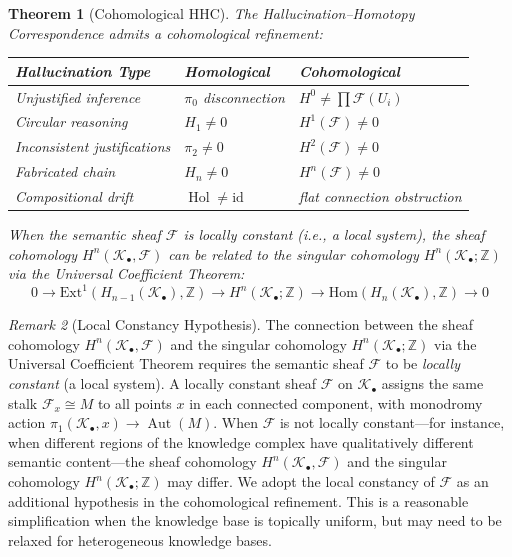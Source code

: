 \documentclass[11pt,a4paper]{article}
\theoremstyle{plain}
\newtheorem{theorem}{Theorem}[section]
\theoremstyle{definition}
\theoremstyle{remark}
\newtheorem{remark}[theorem]{Remark}
\newcommand{\id}{\mathrm{id}}
\newcommand{\Hom}{\mathrm{Hom}}
\DeclareMathOperator{\Aut}{Aut}
\DeclareMathOperator{\Hol}{Hol}
\begin{document}
\begin{theorem}[Cohomological HHC]\label{thm:cohomological-hhc}
The Hallucination--Homotopy Correspondence admits a cohomological refinement:
\begin{center}
\begin{tabular}{lll}
\toprule
\textbf{Hallucination Type} & \textbf{Homological} & \textbf{Cohomological} \\
\midrule
Unjustified inference & $\pi_0$ disconnection & $H^0 \neq \prod \mathcal{F}(U_i)$ \\
Circular reasoning & $H_1 \neq 0$ & $H^1(\mathcal{F}) \neq 0$ \\
Inconsistent justifications & $\pi_2 \neq 0$ & $H^2(\mathcal{F}) \neq 0$ \\
Fabricated chain & $H_n \neq 0$ & $H^n(\mathcal{F}) \neq 0$ \\
Compositional drift & $\Hol \neq \id$ & flat connection obstruction \\
\bottomrule
\end{tabular}
\end{center}
When the semantic sheaf $\mathcal{F}$ is locally constant (i.e., a local system), the sheaf cohomology $H^n(\mathcal{K}_\bullet, \mathcal{F})$ can be related to the singular cohomology $H^n(\mathcal{K}_\bullet; \mathbb{Z})$ via the Universal Coefficient Theorem:
\[
0 \to \mathrm{Ext}^1(H_{n-1}(\mathcal{K}_\bullet), \mathbb{Z}) \to H^n(\mathcal{K}_\bullet; \mathbb{Z}) \to \Hom(H_n(\mathcal{K}_\bullet), \mathbb{Z}) \to 0
\]
\end{theorem}

\begin{remark}[Local Constancy Hypothesis]\label{rem:local-constancy}
The connection between the sheaf cohomology $H^n(\mathcal{K}_\bullet, \mathcal{F})$ and the singular cohomology $H^n(\mathcal{K}_\bullet; \mathbb{Z})$ via the Universal Coefficient Theorem requires the semantic sheaf $\mathcal{F}$ to be \emph{locally constant} (a local system). A locally constant sheaf $\mathcal{F}$ on $\mathcal{K}_\bullet$ assigns the same stalk $\mathcal{F}_x \cong M$ to all points $x$ in each connected component, with monodromy action $\pi_1(\mathcal{K}_\bullet, x) \to \Aut(M)$. When $\mathcal{F}$ is not locally constant---for instance, when different regions of the knowledge complex have qualitatively different semantic content---the sheaf cohomology $H^n(\mathcal{K}_\bullet, \mathcal{F})$ and the singular cohomology $H^n(\mathcal{K}_\bullet; \mathbb{Z})$ may differ. We adopt the local constancy of $\mathcal{F}$ as an additional hypothesis in the cohomological refinement. This is a reasonable simplification when the knowledge base is topically uniform, but may need to be relaxed for heterogeneous knowledge bases.
\end{remark}
\end{document}
